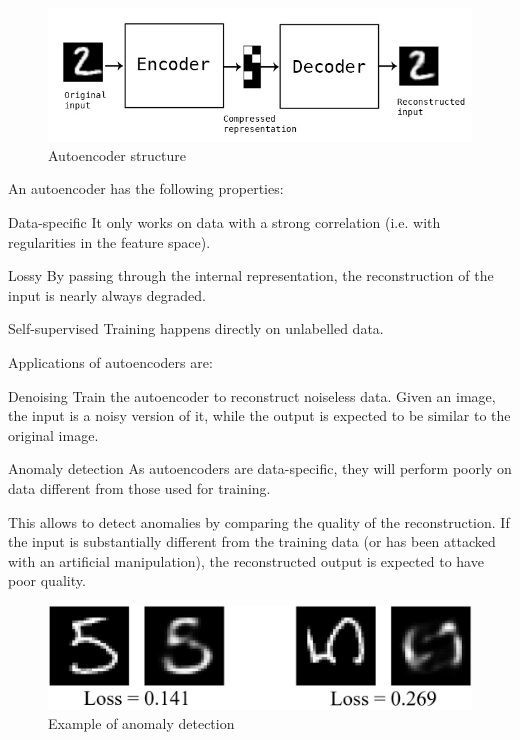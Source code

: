\begin{figure}[H]
    \centering
    \includegraphics[width=0.5\linewidth]{./img/autoencoder.png}
    \caption{Autoencoder structure}
\end{figure}

An autoencoder has the following properties:
\begin{descriptionlist}
    \item[Data-specific] It only works on data with a strong correlation (i.e. with regularities in the feature space).
    \item[Lossy] By passing through the internal representation, the reconstruction of the input is nearly always degraded.
    \item[Self-supervised] Training happens directly on unlabelled data.
\end{descriptionlist}

Applications of autoencoders are:
\begin{descriptionlist}
    \item[Denoising] 
        Train the autoencoder to reconstruct noiseless data.
        Given an image, the input is a noisy version of it, while the output is expected to be similar to the original image.

    \item[Anomaly detection]
        As autoencoders are data-specific, they will perform poorly on data different from those used for training.

        This allows to detect anomalies by comparing the quality of the reconstruction.
        If the input is substantially different from the training data (or has been attacked with an artificial manipulation),
        the reconstructed output is expected to have poor quality.

        \begin{figure}[H]
            \centering
            \includegraphics[width=0.5\linewidth]{./img/autoencoder_anomaly.png}
            \caption{Example of anomaly detection}
        \end{figure}
\end{descriptionlist}